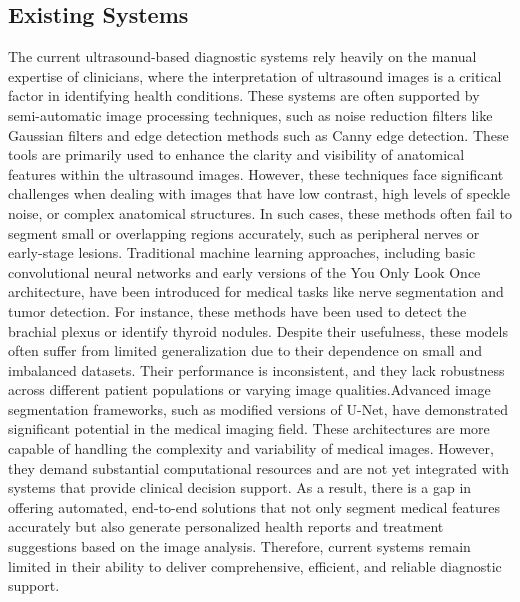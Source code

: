 \documentclass[12pt]{article}
\begin{document}
\subsection{Existing Systems}
\vspace{10pt}
The current ultrasound-based diagnostic systems rely heavily on the manual expertise of clinicians, where the interpretation of ultrasound images is a critical factor in identifying health conditions. These systems are often supported by semi-automatic image processing techniques, such as noise reduction filters like Gaussian filters and edge detection methods such as Canny edge detection. These tools are primarily used to enhance the clarity and visibility of anatomical features within the ultrasound images. However, these techniques face significant challenges when dealing with images that have low contrast, high levels of speckle noise, or complex anatomical structures. In such cases, these methods often fail to segment small or overlapping regions accurately, such as peripheral nerves or early-stage lesions. Traditional machine learning approaches, including basic convolutional neural networks and early versions of the You Only Look Once architecture, have been introduced for medical tasks like nerve segmentation and tumor detection. For instance, these methods have been used to detect the brachial plexus or identify thyroid nodules. Despite their usefulness, these models often suffer from limited generalization due to their dependence on small and imbalanced datasets. Their performance is inconsistent, and they lack robustness across different patient populations or varying image qualities.Advanced image segmentation frameworks, such as modified versions of U-Net, have demonstrated significant potential in the medical imaging field. These architectures are more capable of handling the complexity and variability of medical images. However, they demand substantial computational resources and are not yet integrated with systems that provide clinical decision support. As a result, there is a gap in offering automated, end-to-end solutions that not only segment medical features accurately but also generate personalized health reports and treatment suggestions based on the image analysis. Therefore, current systems remain limited in their ability to deliver comprehensive, efficient, and reliable diagnostic support.

\newpage
\end{document}
